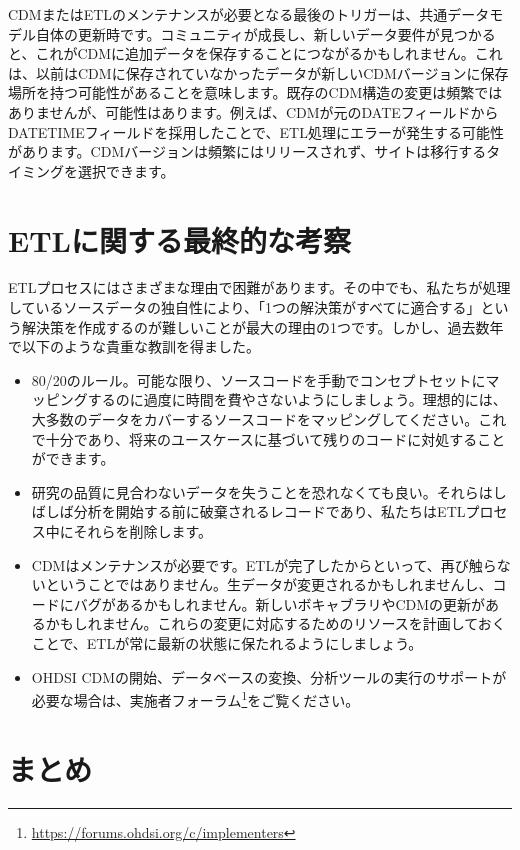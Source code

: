 \documentclass[
  11pt]{book}
\providecommand{\tightlist}{%
  \setlength{\itemsep}{0pt}\setlength{\parskip}{0pt}}
\theoremstyle{definition}
\theoremstyle{definition}
\theoremstyle{definition}
\theoremstyle{definition}
\theoremstyle{remark}
\begin{document}
CDMまたはETLのメンテナンスが必要となる最後のトリガーは、共通データモデル自体の更新時です。コミュニティが成長し、新しいデータ要件が見つかると、これがCDMに追加データを保存することにつながるかもしれません。これは、以前はCDMに保存されていなかったデータが新しいCDMバージョンに保存場所を持つ可能性があることを意味します。既存のCDM構造の変更は頻繁ではありませんが、可能性はあります。例えば、CDMが元のDATEフィールドからDATETIMEフィールドを採用したことで、ETL処理にエラーが発生する可能性があります。CDMバージョンは頻繁にはリリースされず、サイトは移行するタイミングを選択できます。

\section{ETLに関する最終的な考察}\label{etlux306bux95a2ux3059ux308bux6700ux7d42ux7684ux306aux8003ux5bdf}

ETLプロセスにはさまざまな理由で困難があります。その中でも、私たちが処理しているソースデータの独自性により、「1つの解決策がすべてに適合する」という解決策を作成するのが難しいことが最大の理由の1つです。しかし、過去数年で以下のような貴重な教訓を得ました。

\begin{itemize}
\tightlist
\item
  80/20のルール。可能な限り、ソースコードを手動でコンセプトセットにマッピングするのに過度に時間を費やさないようにしましょう。理想的には、大多数のデータをカバーするソースコードをマッピングしてください。これで十分であり、将来のユースケースに基づいて残りのコードに対処することができます。
\item
  研究の品質に見合わないデータを失うことを恐れなくても良い。それらはしばしば分析を開始する前に破棄されるレコードであり、私たちはETLプロセス中にそれらを削除します。
\item
  CDMはメンテナンスが必要です。ETLが完了したからといって、再び触らないということではありません。生データが変更されるかもしれませんし、コードにバグがあるかもしれません。新しいボキャブラリやCDMの更新があるかもしれません。これらの変更に対応するためのリソースを計画しておくことで、ETLが常に最新の状態に保たれるようにしましょう。
\item
  OHDSI CDMの開始、データベースの変換、分析ツールの実行のサポートが必要な場合は、実施者フォーラム\footnote{\url{https://forums.ohdsi.org/c/implementers}}をご覧ください。
\end{itemize}

\section{まとめ}\label{ux307eux3068ux3081-4}
\end{document}
